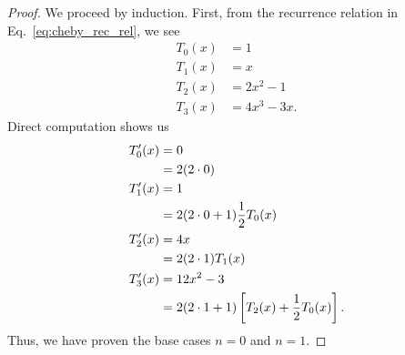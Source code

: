 \begin{proof}
We proceed by induction. First, from the recurrence relation
in Eq.~\eqref{eq:cheby_rec_rel}, we see
%
\begin{align}
    T_{0}(x) &= 1 \nonumber\\
    T_{1}(x) &= x \nonumber\\
    T_{2}(x) &= 2x^{2} - 1 \nonumber\\
    T_{3}(x) &= 4x^{3} - 3x.
\end{align}
%
Direct computation shows us
%
\begin{align}
    T_{0}'(x) &= 0 \nonumber\\
        &= 2(2\cdot0) \nonumber\\
    T_{1}'(x) &= 1 \nonumber\\
        &= 2(2\cdot0+1)\frac{1}{2}T_{0}(x) \nonumber\\
    T_{2}'(x) &= 4x \nonumber\\
        &= 2(2\cdot1)T_{1}(x) \nonumber\\
    T_{3}'(x) &= 12x^{2} - 3 \nonumber\\
        &= 2(2\cdot1+1)\left[ T_{2}(x) + \frac{1}{2}T_{0}(x) \right].
\end{align}
%
Thus, we have proven the base cases $n=0$ and $n=1$.


\end{proof}
